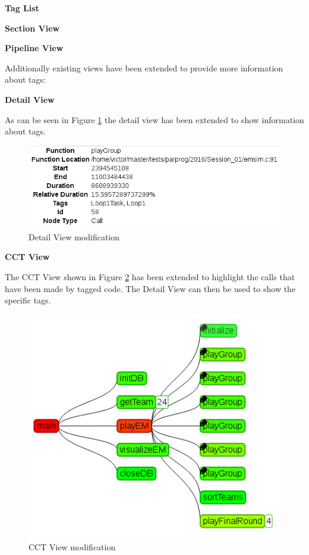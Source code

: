 \textbf{Tag List}

\textbf{Section View}

\textbf{Pipeline View}

Additionally existing views have been extended to provide more information about tags:

\textbf{Detail View}

As can be seen in Figure \ref{cap3:detail} the detail view has been extended to show information about tags. 

\begin{figure}
	\centering
	\includegraphics[width=1\textwidth]{detail-mod}
	\caption{Detail View modification}
	\label{cap3:detail}
\end{figure}

\textbf{CCT View}

The CCT View shown in Figure \ref{cap3:cct} has been extended to highlight the calls that have been made by tagged code. The Detail View can then be used to show the specific tags.

\begin{figure}
	\centering
	\includegraphics[width=1\textwidth]{cct-mod}
	\caption{CCT View modification}
	\label{cap3:cct}
\end{figure}






